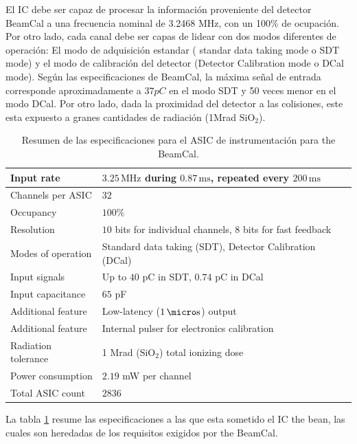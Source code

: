 El IC debe ser capaz de procesar la información proveniente del detector BeamCal a una frecuencia nominal de 3.2468 MHz, con un 100\% de ocupación. Por otro lado, cada canal debe ser capas de lidear con dos modos diferentes de operación: El modo de adquisición estandar ( standar data taking mode o SDT mode) y el modo de calibración del detector (Detector Calibration mode o DCal mode). Según las especificaciones de BeamCal, la máxima señal de entrada corresponde aproximadamente a $37pC$ en el modo SDT  y 50 veces menor en el modo DCal.
Por otro lado, dada la proximidad del detector a las colisiones, este esta expuesto a granes cantidades de radiación (1Mrad $\text{SiO}_2$).

\begin{table}[!h]
	\begin{center}
		\begin{tabular}{|l|l|}\hline
			Input rate & $3.25\,\text{MHz}$ during $0.87\,\text{ms}$, repeated every $200\,\text{ms}$ \\ \hline
			Channels per ASIC & $32$ \\ \hline
			Occupancy & $100\%$ \\ \hline
			Resolution & $10$ bits for individual channels, $8$ bits for fast feedback \\ \hline
			Modes of operation & Standard data taking (SDT), Detector Calibration (DCal) \\ \hline
			Input signals & Up to $40$ pC in SDT, $0.74$ pC in DCal \\ \hline
			Input capacitance & $65$ pF \\ \hline
			Additional feature & Low-latency ($1\,\micro\text{s}$) output \\ \hline
			Additional feature & Internal pulser for electronics calibration \\ \hline
			Radiation tolerance & 1 Mrad ($\text{SiO}_2$) total ionizing dose \\ \hline
			Power consumption & $2.19$ mW per channel \\ \hline
			Total ASIC count & $2836$ \\\hline
		\end{tabular}
		\vspace*{5pt}
		\caption{Resumen de las especificaciones para el ASIC de instrumentación para the BeamCal.}\label{tab:bean_specs}
	\end{center}
\end{table}

 La tabla \ref{tab:bean_specs} resume las especificaciones a las que esta sometido el IC the bean, las cuales son heredadas de los requisitos exigidos por the BeamCal.


